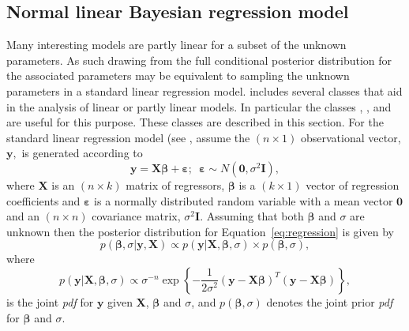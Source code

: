 \documentclass[article]{jss}
\begin{document}
\subsection{Normal linear Bayesian regression model}
\label{sec: Regression Model}

Many interesting models are partly linear for a subset of the unknown
parameters. As such drawing from the full conditional posterior
distribution for the associated parameters may be equivalent to
sampling the unknown parameters in a standard linear regression model.
 includes several classes that aid in the analysis of
linear or partly linear models. In particular the classes
, ,
 and  are useful for
this purpose. These classes are described in this section.  For the
standard linear regression model (see \citet{Zellner1971}, assume the
$\left(n\times1\right)$ observational vector, $\bm{y},$ is generated
according to\begin{equation}
  \bm{y}=\bm{X}\bm{\beta}+\bm{\varepsilon};\,\,\,\bm{\varepsilon}\sim
  N(\bm{0},\sigma^{2}\bm{I}),\label{eq:regression}
\end{equation} where
$\bm{X}$ is an $(n\times k)$ matrix of regressors, $\bm{\beta}$ is a
$\left(k\times1\right)$ vector of regression coefficients and
$\bm{\varepsilon}$ is a normally distributed random variable with a
mean vector $\bm{0}$ and an $\left(n\times n\right)$ covariance
matrix, $\sigma^{2}\bm{I}.$ Assuming that both $\bm{\beta}$ and
$\sigma$ are unknown then the posterior distribution for Equation~\ref{eq:regression} is given by\begin{equation}
  p(\bm{\beta},\sigma|\bm{y},\bm{X})\propto
  p(\bm{y}|\bm{X},\bm{\beta},\sigma)\times
  p(\bm{\beta},\sigma),\label{eq:post regression}
\end{equation} where
\begin{equation}
  p(\bm{y}|\bm{X},\bm{\beta},\sigma)\propto\sigma^{-n}\exp\left\{
    -\frac{1}{2\sigma^{2}}\left(\bm{y}-\bm{X}\bm{\beta}\right)^{T}\left(\bm{y}-\bm{X}\bm{\beta}\right)\right\}
  ,\label{eq:likelihood regression}
\end{equation} is the joint
\emph{pdf} for $\bm{y}$ given $\bm{X}$, $\bm{\beta}$ and
$\sigma$, and\emph{ $p(\bm{\beta},\sigma)$ } denotes the joint
prior \emph{pdf} for $\bm{\beta}$ and $\sigma$.
\end{document}
